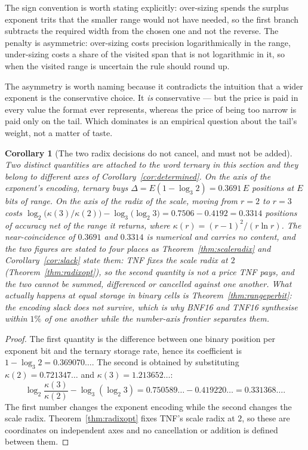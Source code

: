 \documentclass[11pt]{article}
\newtheorem{corollary}{Corollary}
\theoremstyle{definition}
\begin{document}
The sign convention is worth stating explicitly: over-sizing spends the surplus
exponent trits that the smaller range would not have needed, so the first branch
subtracts the required width from the chosen one and not the reverse. The penalty
is asymmetric: over-sizing costs precision logarithmically in the range,
under-sizing costs a share of the visited span that is not logarithmic in it, so
when the visited range is uncertain the rule should round up.

The asymmetry is worth naming because it contradicts the intuition that a wider
exponent is the conservative choice. It \emph{is} conservative --- but the price is
paid in every value the format ever represents, whereas the price of being too
narrow is paid only on the tail. Which dominates is an empirical question about
the tail's weight, not a matter of taste.

\begin{corollary}[The two radix decisions do not cancel, and must not be added]
\label{cor:worth}
Two distinct quantities are attached to the word \emph{ternary} in this section and
they belong to different axes of Corollary~\ref{cor:determined}. On the axis of the
\emph{exponent's encoding}, ternary buys $\Delta = E(1-\log_3 2) = 0.3691\,E$
positions at $E$ bits of range. On the axis of the \emph{radix of the scale},
moving from $r{=}2$ to $r{=}3$ costs $\log_2\bigl(\kappa(3)/\kappa(2)\bigr) -
\log_3\bigl(\log_2 3\bigr) = 0.7506 - 0.4192 = 0.3314$ positions of accuracy net
of the range it returns, where
$\kappa(r) = (r-1)^2/(r \ln r)$. The near-coincidence of $0.3691$ and $0.3314$ is
numerical and carries no content, and the two figures are stated to four places as
Theorem~\ref{thm:scaleradix} and Corollary~\ref{cor:slack} state them: TNF fixes the scale radix at $2$
(Theorem~\ref{thm:radixopt}), so the second quantity is not a price TNF pays, and
the two cannot be summed, differenced or cancelled against one another. What
actually happens at equal storage in binary cells is
Theorem~\ref{thm:rangeperbit}: the encoding slack does not survive, which is why
BNF16 and TNF16 synthesise within $1\%$ of one another while the number-axis
frontier separates them.
\end{corollary}
\begin{proof}
The first quantity is the difference between one binary position per exponent
bit and the ternary storage rate, hence its coefficient is
$1-\log_3 2=0.369070\ldots$. The second is obtained by substituting
$\kappa(2)=0.721347\ldots$ and $\kappa(3)=1.213652\ldots$:
\[
\log_2\!\frac{\kappa(3)}{\kappa(2)}
-\log_3(\log_2 3)
=0.750589\ldots-0.419220\ldots
=0.331368\ldots.
\]
The first number changes the exponent encoding while the second changes the
scale radix. Theorem~\ref{thm:radixopt} fixes TNF's scale radix at $2$, so
these are coordinates on independent axes and no cancellation or addition is
defined between them.
\end{proof}
\end{document}
